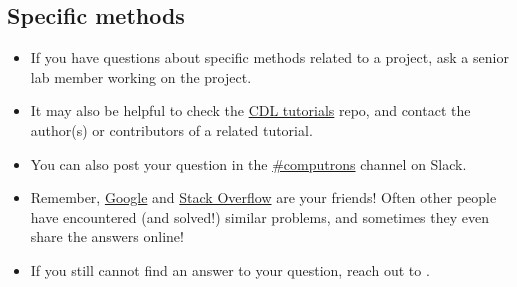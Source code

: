 \documentclass{tufte-book} %
\begin{document}
\subsection{Specific methods}
\begin{itemize}
\item If you have questions about specific methods related to a
  project, ask a senior lab member working on the project.

\item It may also be helpful to check the
  \href{https://github.com/contextLab/cdl-tutorials}{CDL tutorials}
  repo, and contact the author(s) or contributors of a related
  tutorial.

\item You can also post your question in the
  \href{https://context-lab.slack.com/messages/computrons/}{\#computrons}
  channel on Slack.

\item Remember, \href{https://www.google.com/}{Google} and
  \href{https://stackoverflow.com/}{Stack Overflow} are your friends!
  Often other people have encountered (and solved!) similar problems,
  and sometimes they even share the answers online!

\item If you still cannot find an answer to your question, reach out to \director.
\end{itemize}
\end{document}
